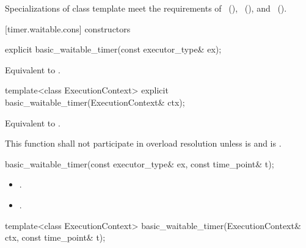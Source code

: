 \pnum
Specializations of class template  meet the requirements of ~(), ~(), and ~().


[timer.waitable.cons]{ constructors}

%
\begin{itemdecl}
explicit basic_waitable_timer(const executor_type& ex);
\end{itemdecl}

\begin{itemdescr}
\pnum
\effects Equivalent to .
\end{itemdescr}

\begin{itemdecl}
template<class ExecutionContext>
  explicit basic_waitable_timer(ExecutionContext& ctx);
\end{itemdecl}

\begin{itemdescr}
\pnum
\effects Equivalent to .

\pnum
\remarks This function shall not participate in overload resolution unless
 is 
and  is .
\end{itemdescr}

\begin{itemdecl}
basic_waitable_timer(const executor_type& ex, const time_point& t);
\end{itemdecl}

\begin{itemdescr}
\pnum
\postconditions
\begin{itemize}
\item
{}.
\item
{}.
\end{itemize}
\end{itemdescr}

\begin{itemdecl}
template<class ExecutionContext>
  basic_waitable_timer(ExecutionContext& ctx, const time_point& t);
\end{itemdecl}

